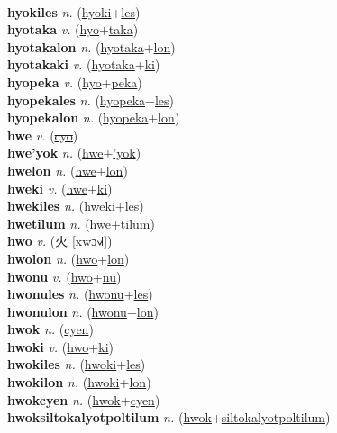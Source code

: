  \label{hyoki} \\
\textbf{hyokiles} \textit{n.} (\hyperref[hyoki]{hyoki}+\hyperref[les]{les})
 \label{hyokiles} \\
\textbf{hyotaka} \textit{v.} (\hyperref[hyo]{hyo}+\hyperref[taka]{taka})
 \label{hyotaka} \\
\textbf{hyotakalon} \textit{n.} (\hyperref[hyotaka]{hyotaka}+\hyperref[lon]{lon})
 \label{hyotakalon} \\
\textbf{hyotakaki} \textit{v.} (\hyperref[hyotaka]{hyotaka}+\hyperref[ki]{ki})
 \label{hyotakaki} \\
\textbf{hyopeka} \textit{v.} (\hyperref[hyo]{hyo}+\hyperref[peka]{peka})
 \label{hyopeka} \\
\textbf{hyopekales} \textit{n.} (\hyperref[hyopeka]{hyopeka}+\hyperref[les]{les})
 \label{hyopekales} \\
\textbf{hyopekalon} \textit{n.} (\hyperref[hyopeka]{hyopeka}+\hyperref[lon]{lon})
 \label{hyopekalon} \\
\textbf{hwe} \textit{v.} (\hyperref[cyo]{\sout{cyo}})
 \label{hwe} \\
\textbf{hwe'yok} \textit{n.} (\hyperref[hwe]{hwe}+\hyperref['yok]{'yok})
 \label{hwe'yok} \\
\textbf{hwelon} \textit{n.} (\hyperref[hwe]{hwe}+\hyperref[lon]{lon})
 \label{hwelon} \\
\textbf{hweki} \textit{v.} (\hyperref[hwe]{hwe}+\hyperref[ki]{ki})
 \label{hweki} \\
\textbf{hwekiles} \textit{n.} (\hyperref[hweki]{hweki}+\hyperref[les]{les})
 \label{hwekiles} \\
\textbf{hwetilum} \textit{n.} (\hyperref[hwe]{hwe}+\hyperref[tilum]{tilum})
 \label{hwetilum} \\
\textbf{hwo} \textit{v.} ({\chinese{}火} [xwɔ˧˩˧])
 \label{hwo} \\
\textbf{hwolon} \textit{n.} (\hyperref[hwo]{hwo}+\hyperref[lon]{lon})
 \label{hwolon} \\
\textbf{hwonu} \textit{v.} (\hyperref[hwo]{hwo}+\hyperref[nu]{nu})
 \label{hwonu} \\
\textbf{hwonules} \textit{n.} (\hyperref[hwonu]{hwonu}+\hyperref[les]{les})
 \label{hwonules} \\
\textbf{hwonulon} \textit{n.} (\hyperref[hwonu]{hwonu}+\hyperref[lon]{lon})
 \label{hwonulon} \\
\textbf{hwok} \textit{n.} (\hyperref[cyen]{\sout{cyen}})
 \label{hwok} \\
\textbf{hwoki} \textit{v.} (\hyperref[hwo]{hwo}+\hyperref[ki]{ki})
 \label{hwoki} \\
\textbf{hwokiles} \textit{n.} (\hyperref[hwoki]{hwoki}+\hyperref[les]{les})
 \label{hwokiles} \\
\textbf{hwokilon} \textit{n.} (\hyperref[hwoki]{hwoki}+\hyperref[lon]{lon})
 \label{hwokilon} \\
\textbf{hwokcyen} \textit{n.} (\hyperref[hwok]{hwok}+\hyperref[cyen]{cyen})
 \label{hwokcyen} \\
\textbf{hwoksiltokalyotpoltilum} \textit{n.} (\hyperref[hwok]{hwok}+\hyperref[siltokalyotpoltilum]{siltokalyotpoltilum})
 \label{hwoksiltokalyotpoltilum} 


